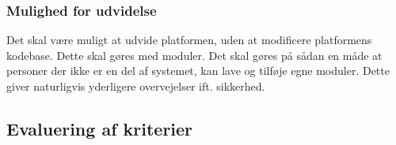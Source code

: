 \subsubsection{Mulighed for udvidelse}
Det skal være muligt at udvide platformen, uden at modificere platformens kodebase.
Dette skal gøres med moduler.
Det skal gøres på sådan en måde at personer der ikke er en del af systemet, kan lave og tilføje egne moduler.
Dette giver naturligvis yderligere overvejelser ift. sikkerhed.

\subsection{Evaluering af kriterier}
